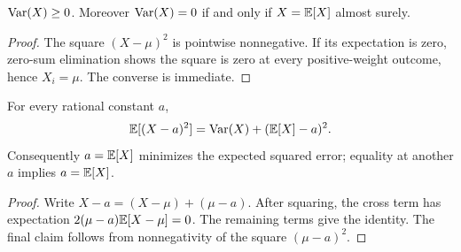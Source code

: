 \begin{theorem}\label{thm:variance-zero}
\(\operatorname{Var}(X)\ge0\).  Moreover \(\operatorname{Var}(X)=0\) if and only if \(X=\mathbb E[X]\) almost
surely.
\end{theorem}

\begin{proof}
The square \((X-\mu)^2\) is pointwise nonnegative.  If its expectation is zero,
zero-sum elimination shows the square is zero at every positive-weight
outcome, hence \(X_i=\mu\).  The converse is immediate.
\end{proof}

\begin{theorem}\label{thm:mean-minimizes}
For every rational constant \(a\),
\[
 \mathbb E[(X-a)^2]=\operatorname{Var}(X)+(\mathbb E[X]-a)^2.
\]
Consequently \(a=\mathbb E[X]\) minimizes the expected squared error; equality at
another \(a\) implies \(a=\mathbb E[X]\).
\end{theorem}

\begin{proof}
Write \(X-a=(X-\mu)+(\mu-a)\).  After squaring, the cross term has expectation
\(2(\mu-a)\mathbb E[X-\mu]=0\).  The remaining terms give the identity.  The final
claim follows from nonnegativity of the square \((\mu-a)^2\).
\end{proof}
